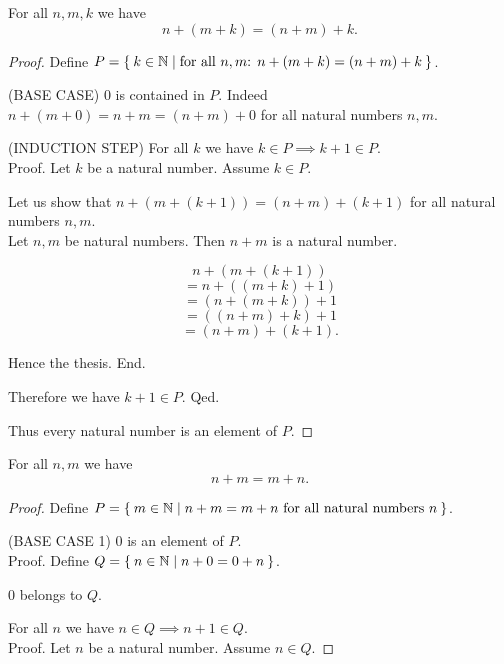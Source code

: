 \documentclass[../../natural-numbers.ftl.tex]{subfiles}
\begin{document}
  \begin{forthel}
    \begin{proposition}\label{Arithmetic_01_02_468785}
      For all $n,m,k$ we have \[ n + (m + k) = (n + m) + k. \]
    \end{proposition}
    \begin{proof}
      Define $P = \Set{ k \in \mathbb{N} | \text{for all $n,m$: $n + (m + k) = (n + m) + k$}}$.

      (BASE CASE) $0$ is contained in $P$.
      Indeed $n + (m + 0) = n + m = (n + m) + 0$ for all natural numbers $n,m$.

      (INDUCTION STEP) For all $k$ we have $k \in P \implies k + 1 \in P$. \\
      Proof.
        Let $k$ be a natural number.
         Assume $k \in P$.

        Let us show that $n + (m + (k + 1)) = (n + m) + (k + 1)$ for all natural numbers $n,m$. \\
          Let $n,m$ be natural numbers.
          Then $n + m$ is a natural number.

          \[   n + (m + (k + 1)) \]
          \[ = n + ((m + k) + 1) \]  %
          \[ = (n + (m + k)) + 1 \]  %
          \[ = ((n + m) + k) + 1 \]  %
          \[ = (n + m) + (k + 1). \] %

          Hence the thesis.
        End.

        Therefore we have $k + 1 \in P$.
      Qed.

      Thus every natural number is an element of $P$.
    \end{proof}


    \begin{proposition}\label{Arithmetic_01_02_273100}
      For all $n,m$ we have \[ n + m = m + n. \]
    \end{proposition}
    \begin{proof}
      Define $P = \Set{m \in \mathbb{N} | \text{$n + m = m + n$ for all natural numbers $n$}}$.

      (BASE CASE 1) $0$ is an element of $P$. \\
      Proof.
        Define $Q = \Set{n \in \mathbb{N} | n + 0 = 0 + n}$.

        $0$ belongs to $Q$.

        For all $n$ we have $n \in Q \implies n + 1 \in Q$. \\
        Proof.
          Let $n$ be a natural number.
          Assume $n \in Q$.


\end{proof}
\end{forthel}
\end{document}
